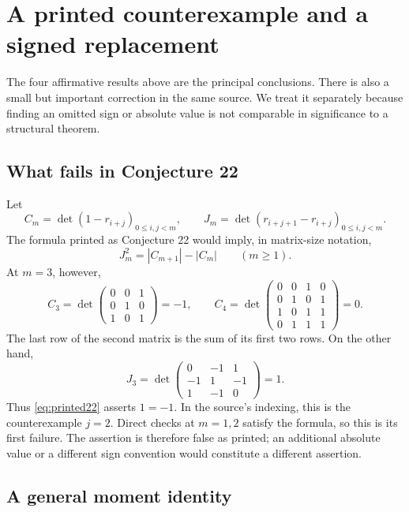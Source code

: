 \documentclass[11pt,a4paper]{article}
\numberwithin{equation}{section}
\theoremstyle{definition}
\theoremstyle{remark}
\begin{document}
\section{A printed counterexample and a signed replacement}\label{sec:correction}

The four affirmative results above are the principal conclusions.
There is also a small but important correction in the same source.
We treat it separately because finding an omitted sign or absolute
value is not comparable in significance to a structural theorem.

\subsection{What fails in Conjecture 22}

Let
\begin{equation}\label{eq:complementdefs}
 C_m=\det(1-r_{i+j})_{0\le i,j<m},\qquad
 J_m=\det(r_{i+j+1}-r_{i+j})_{0\le i,j<m}.
\end{equation}
The formula printed as Conjecture 22 would imply, in matrix-size
notation,
\begin{equation}\label{eq:printed22}
 J_m^2=|C_{m+1}|-|C_m|\qquad(m\ge1).
\end{equation}
At $m=3$, however,
\[
 C_3=\det\begin{pmatrix}0&0&1\\0&1&0\\1&0&1\end{pmatrix}=-1,
 \qquad
 C_4=\det\begin{pmatrix}
 0&0&1&0\\0&1&0&1\\1&0&1&1\\0&1&1&1
 \end{pmatrix}=0.
\]
The last row of the second matrix is the sum of its first two rows.
On the other hand,
\[
 J_3=\det\begin{pmatrix}0&-1&1\\-1&1&-1\\1&-1&0\end{pmatrix}=1.
\]
Thus \eqref{eq:printed22} asserts $1=-1$. In the source's indexing,
this is the counterexample $j=2$. Direct checks at $m=1,2$ satisfy
the formula, so this is its first failure. The assertion is therefore
false as printed; an additional absolute value or a different sign
convention would constitute a different assertion.

\subsection{A general moment identity}
\end{document}
